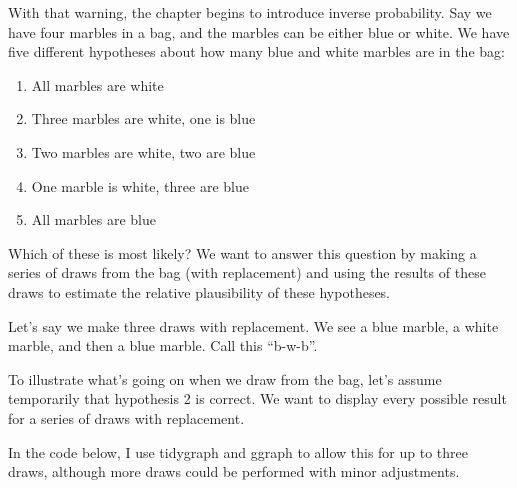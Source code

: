 \documentclass[
]{book}
\providecommand{\tightlist}{%
  \setlength{\itemsep}{0pt}\setlength{\parskip}{0pt}}
\begin{document}
With that warning, the chapter begins to introduce inverse probability. Say we have four marbles in a bag, and the marbles can be either blue or white. We have five different hypotheses about how many blue and white marbles are in the bag:

\begin{enumerate}
\def\labelenumi{\arabic{enumi}.}
\tightlist
\item
  All marbles are white
\item
  Three marbles are white, one is blue
\item
  Two marbles are white, two are blue
\item
  One marble is white, three are blue
\item
  All marbles are blue
\end{enumerate}

Which of these is most likely? We want to answer this question by making a series of draws from the bag (with replacement) and using the results of these draws to estimate the relative plausibility of these hypotheses.

Let's say we make three draws with replacement. We see a blue marble, a white marble, and then a blue marble. Call this ``b-w-b''.

To illustrate what's going on when we draw from the bag, let's assume temporarily that hypothesis 2 is correct. We want to display every possible result for a series of draws with replacement.

In the code below, I use tidygraph and ggraph to allow this for up to three draws, although more draws could be performed with minor adjustments.
\end{document}
